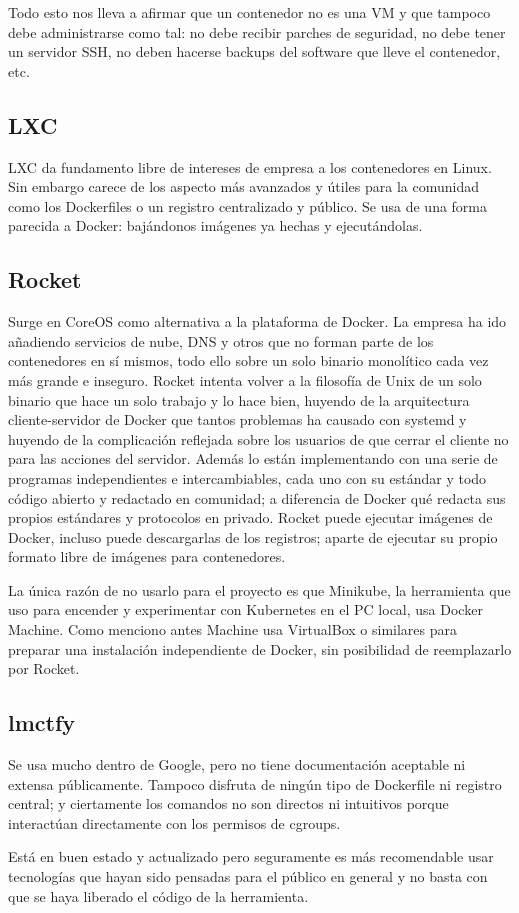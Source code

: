 Todo esto nos lleva a afirmar que un contenedor no es una VM\cite{mikecoleman2016} y que tampoco debe administrarse como tal: no debe recibir parches de seguridad, no debe tener un servidor SSH, no deben hacerse backups del software que lleve el contenedor, etc.

\subsection{LXC}
\label{subsec:docker-compare-lxc}

LXC\cite{lxc} da fundamento libre de intereses de empresa a los contenedores en Linux. Sin embargo carece de los aspecto más avanzados y útiles para la comunidad como los Dockerfiles o un registro centralizado y público. Se usa de una forma parecida a Docker: bajándonos imágenes ya hechas y ejecutándolas.

\subsection{Rocket}
\label{subsec:docker-compare-rocker}

Surge en CoreOS como alternativa a la plataforma de Docker\cite{coreosrkt}. La empresa ha ido añadiendo servicios de nube, DNS y otros que no forman parte de los contenedores en sí mismos, todo ello sobre un solo binario monolítico cada vez más grande e inseguro. Rocket intenta volver a la filosofía de Unix de un solo binario que hace un solo trabajo y lo hace bien, huyendo de la arquitectura cliente-servidor de Docker que tantos problemas ha causado con systemd\cite{dockersystemd} y huyendo de la complicación reflejada sobre los usuarios de que cerrar el cliente no para las acciones del servidor. Además lo están implementando con una serie de programas independientes e intercambiables, cada uno con su estándar y todo código abierto y redactado en comunidad; a diferencia de Docker qué redacta sus propios estándares y protocolos en privado. Rocket puede ejecutar imágenes de Docker, incluso puede descargarlas de los registros; aparte de ejecutar su propio formato libre de imágenes para contenedores.

La única razón de no usarlo para el proyecto es que Minikube, la herramienta que uso para encender y experimentar con Kubernetes en el PC local, usa Docker Machine. Como menciono antes Machine usa VirtualBox o similares para preparar una instalación independiente de Docker, sin posibilidad de reemplazarlo por Rocket.

\subsection{lmctfy}
\label{subsec:docker-compare-lmctfy}

Se usa mucho dentro de Google, pero no tiene documentación aceptable ni extensa públicamente. Tampoco disfruta de ningún tipo de Dockerfile ni registro central; y ciertamente los comandos no son directos ni intuitivos porque interactúan directamente con los permisos de cgroups.

Está en buen estado y actualizado pero seguramente es más recomendable usar tecnologías que hayan sido pensadas para el público en general y no basta con que se haya liberado el código de la herramienta.
